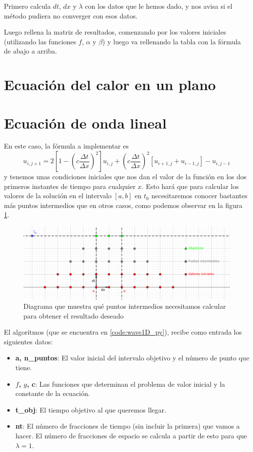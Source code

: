 Primero calcula $dt$, $dx$ y $\lambda$ con los datos que le hemos dado, y nos avisa si el método pudiera no converger con esos datos.

Luego rellena la matriz de resultados, comenzando por los valores iniciales (utilizando las funciones $f$, $\alpha$ y $\beta$) y luego va rellenando la tabla con la fórmula de abajo a arriba.


\section{Ecuación del calor en un plano}

\section{Ecuación de onda lineal}
En este caso, la fórmula a implementar es
\begin{equation}
	u_{i,j+1} =  2\left[1 - \left(c\frac{\Delta t}{\Delta x}\right)^2\right]u_{i,j} + \left(c\frac{\Delta t}{\Delta x}\right)^2[u_{i+1,j} + u_{i-1,j}] - u_{i,j-1}
\end{equation}
y tenemos unas condiciones iniciales que nos dan el valor de la función en los dos primeros instantes de tiempo para cualquier $x$. Esto hará que para calcular los valores de la solución en el intervalo  $[a,b]$ en $t_0$ necesitaremos conocer bastantes más puntos intermedios que en otros casos, como podemos observar en la figura \ref{fig:1dwavepoints}.

\begin{figure}
	\includegraphics[width=\linewidth]{Imagenes/Bitmap/1dwavepoints.png}
	\caption[Puntos ecuación del calor lineal]{Diagrama que muestra qué puntos intermedios necesitamos calcular para obtener el resultado deseado}
	\label{fig:1dwavepoints}
\end{figure}

El algoritmos (que se encuentra en \ref{code:wave1D_py}), recibe como entrada los siguientes datos:
\begin{itemize}[label=$\bullet$]
	\item \textbf{a, n\_puntos}: El valor inicial del intervalo objetivo y el número de punto que tiene.
	\item \textbf{$f$, $g$, c}: Las funciones que determinan el problema de valor inicial y la constante de la ecuación.
	\item \textbf{t\_obj}: El tiempo objetivo al que queremos llegar.
	\item \textbf{nt}: El número de fracciones de tiempo (sin incluir la primera) que vamos a hacer. El número de fracciones de espacio se calcula a partir de esto para que $\lambda=1$.
\end{itemize}

